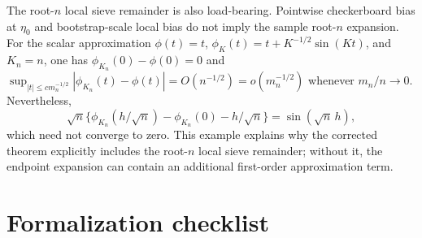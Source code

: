 \documentclass[11pt]{article}
\theoremstyle{definition}
\theoremstyle{plain}
\theoremstyle{remark}
\begin{document}
The root-\(n\) local sieve remainder is also load-bearing.  Pointwise checkerboard bias at \(\eta_0\) and bootstrap-scale local bias do not imply the sample root-\(n\) expansion.  For the scalar approximation \(\phi(t)=t\), \(\phi_K(t)=t+K^{-1/2}\sin(Kt)\), and \(K_n=n\), one has \(\phi_{K_n}(0)-\phi(0)=0\) and \(\sup_{|t|\le c m_n^{-1/2}}|\phi_{K_n}(t)-\phi(t)|=O(n^{-1/2})=o(m_n^{-1/2})\) whenever \(m_n/n\to0\).  Nevertheless,
\[
\sqrt n\{\phi_{K_n}(h/\sqrt n)-\phi_{K_n}(0)-h/\sqrt n\}
=\sin(\sqrt n\,h),
\]
which need not converge to zero.  This example explains why the corrected theorem explicitly includes the root-\(n\) local sieve remainder; without it, the endpoint expansion can contain an additional first-order approximation term.

\section{Formalization checklist}
\end{document}

